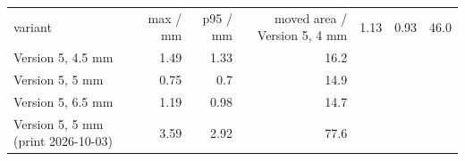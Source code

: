 
\begin{tabular}{lrrr}
\toprule
variant & max / mm & p95 / mm & moved area / %
\midrule
Version 5, 4 mm & 1.13 & 0.93 & 46.0 \\
Version 5, 4.5 mm & 1.49 & 1.33 & 16.2 \\
Version 5, 5 mm & 0.75 & 0.7 & 14.9 \\
Version 5, 6.5 mm & 1.19 & 0.98 & 14.7 \\
Version 5, 5 mm (print 2026-10-03) & 3.59 & 2.92 & 77.6 \\
\bottomrule
\end{tabular}
